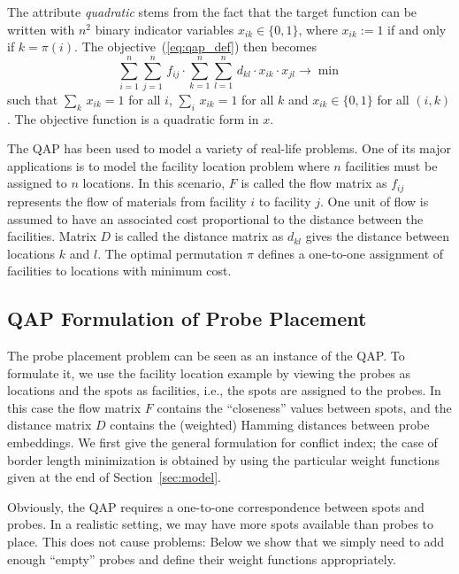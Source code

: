 \documentclass[english]{lni}
\begin{document}
The attribute \emph{quadratic} stems from the fact that the target function
can be written with $n^2$ binary indicator variables $x_{ik}\in\{0,1\}$, where
$x_{ik}:=1$ if and only if $k=\pi(i)$. The objective~(\ref{eq:qap_def}) then
becomes
\begin{equation}\label{eq:qap_x}
  \sum_{i=1}^{n} \sum_{j=1}^{n}\,  f_{ij} \cdot 
  \sum_{k=1}^{n} \sum_{l=1}^{n}\,  d_{kl} \cdot x_{ik}\cdot x_{jl}
  \to \min
\end{equation}
such that $\sum_{k}\, x_{ik}=1$ for all $i$, $\sum_{i}\, x_{ik}=1$ for all $k$
and $x_{ik}\in\{0,1\}$ for all $(i,k)$. The objective function is a quadratic
form in $x$.

The QAP has been used to model a variety of real-life problems. One of its
major applications is to model the facility location problem where $n$
facilities must be assigned to $n$ locations. In this scenario, $F$ is called
the flow matrix as $f_{ij}$ represents the flow of materials from facility $i$
to facility $j$. One unit of flow is assumed to have an associated cost
proportional to the distance between the facilities. Matrix $D$ is called the
distance matrix as $d_{kl}$ gives the distance between locations $k$ and $l$.
The optimal permutation $\pi$ defines a one-to-one assignment of facilities to
locations with minimum cost.

\subsection{QAP Formulation of Probe Placement}
\label{sec:qap_form}

The probe placement problem can be seen as an instance of the QAP. To
formulate it, we use the facility location example by viewing the probes as
locations and the spots as facilities, i.e., the spots are assigned to the
probes. In this case the flow matrix $F$ contains the ``closeness'' values
between spots, and the distance matrix $D$ contains the (weighted) Hamming
distances between probe embeddings.  We first give the general formulation for
conflict index; the case of border length minimization is obtained by using
the particular weight functions given at the end of
Section~\ref{sec:model}.

Obviously, the QAP requires a one-to-one correspondence between spots and
probes. In a realistic setting, we may have more spots available than probes
to place. This does not cause problems: Below we show that we simply need to
add enough ``empty'' probes and define their weight functions appropriately.
\end{document}
